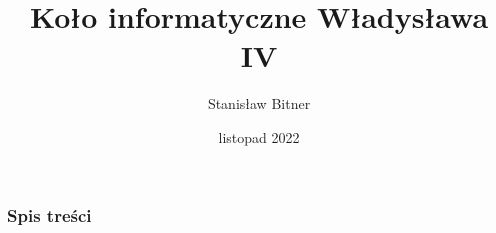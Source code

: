 \documentclass[11pt]{beamer}
\title{Koło informatyczne Władysława IV}
\author{Stanisław Bitner}
\date{listopad 2022}
\begin{document}
\frame{\titlepage}

\begin{frame}
  \frametitle{Spis treści}
  \tableofcontents[hideallsubsections]
\end{frame}

% 
% 
% 
% 
% 
% 
% 

\end{document}
